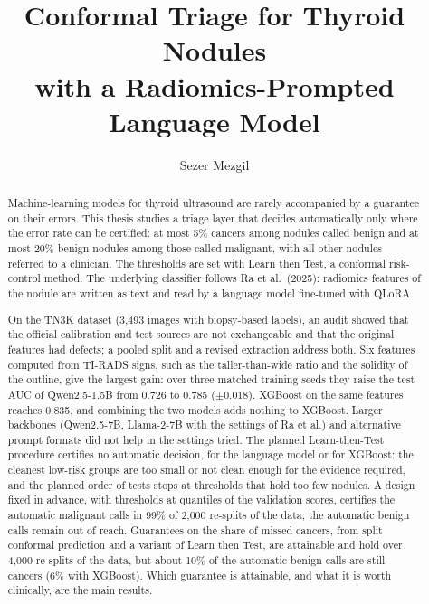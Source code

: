 \documentclass[a4paper,oneside,english]{sapthesis}
\title{Conformal Triage for Thyroid Nodules\\with a Radiomics-Prompted Language Model}
\author{Sezer Mezgil}
\begin{document}
\frontmatter
\maketitle

\begin{abstract}
Machine-learning models for thyroid ultrasound are rarely accompanied by a guarantee on their
errors. This thesis studies a triage layer that decides automatically only where the error rate can
be certified: at most 5\% cancers among nodules called benign and at most 20\% benign nodules among
those called malignant, with all other nodules referred to a clinician. The thresholds are set with
Learn then Test, a conformal risk-control method. The underlying classifier follows Ra et al.\
(2025): radiomics features of the nodule are written as text and read by a language model
fine-tuned with QLoRA.

On the TN3K dataset (3,493 images with biopsy-based labels), an audit showed that the official
calibration and test sources are not exchangeable and that the original features had defects; a
pooled split and a revised extraction address both. Six features computed from TI-RADS signs,
such as the taller-than-wide ratio and the solidity of the outline, give the largest gain: over
three matched training seeds they raise the test AUC of Qwen2.5-1.5B from 0.726 to 0.785
($\pm 0.018$). XGBoost on the same features reaches 0.835, and combining the two models adds
nothing to XGBoost. Larger backbones (Qwen2.5-7B, Llama-2-7B with the settings of Ra et al.) and
alternative prompt formats did not help in the settings tried. The planned Learn-then-Test procedure certifies no
automatic decision, for the language model or for XGBoost: the cleanest low-risk groups are too
small or not clean enough for the evidence required, and the planned order of tests stops at
thresholds that hold too few nodules. A design fixed in advance, with thresholds at quantiles of
the validation scores, certifies the automatic malignant calls in 99\% of 2,000 re-splits of the
data; the automatic benign calls remain out of reach. Guarantees on the share of missed cancers, from split
conformal prediction and a variant of Learn then Test, are attainable and hold over 4,000 re-splits
of the data, but about 10\% of the automatic benign calls are still cancers (6\% with XGBoost).
Which guarantee is attainable, and what it is worth clinically, are the main results.
\end{abstract}

\tableofcontents

\mainmatter








\backmatter
\cleardoublepage
{}
{}


\end{document}

